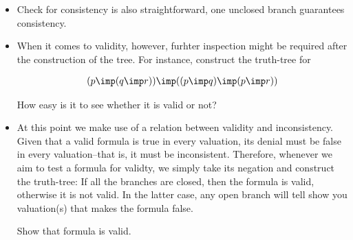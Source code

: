 \documentclass[11pt]{article}
\begin{document}
\begin{itemize}
\begin{uexample}
\begin{align}
\begin{tikzpicture}[level distance=40pt, sibling distance=30pt] 
\tikzset{every tree node/.style={align=center,anchor=north}}
\Tree [.$\cancel{-(p\imp q)\land -p}$ [.$\cancel{-(p\imp q)}$ [.$-p$ [.$p$ $-q$\\$\times$ ] ] ] ]
\end{tikzpicture}
\end{align}

As all the branches are closed, we can conclude that  is
inconsistent. 

\qed
\end{uexample}

\item Check for consistency is also straightforward, one unclosed branch
guarantees consistency.

\item When it comes to validity, however, furhter inspection might be required
after the construction of the tree. For instance, construct the truth-tree for

\begin{align}\label{validex}
(p\imp(q\imp r)) \imp ((p\imp q)\imp(p\imp r))
\end{align}

How easy is it to see whether it is valid or not?

\item At this point we make use of a relation between validity and
inconsistency. Given that a valid formula is true in every valuation, its denial
must be false in every valuation--that is, it must be inconsistent. Therefore,
whenever we aim to test a formula for validty, we simply take its negation and
construct the truth-tree: If all the branches are closed, then the formula is
valid, otherwise it is not valid. In the latter case, any open branch will tell
show you valuation(s) that makes the formula false.

\begin{uexample}
Show that formula  is valid. 


\end{uexample}
\end{itemize}
\end{document}
